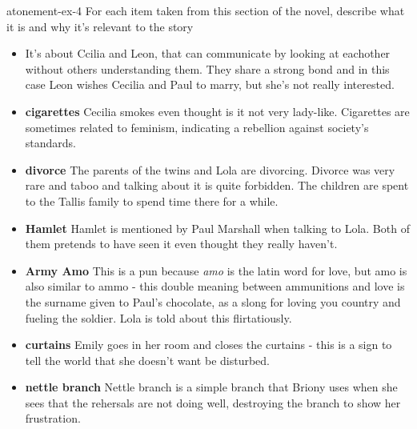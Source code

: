 \documentclass[preview]{standalone}
\begin{document}
\begin{snippetexercise}{atonement-ex-4}%
{For each item taken from this section of the novel, describe what it is and why it's relevant to the
story}
\begin{itemize}
    \item \textbf{}
        It's about Ccilia and Leon, that can communicate by looking at eachother
        without others understanding them. They share a strong bond and in this case
        Leon wishes Cecilia and Paul to marry, but she's not really interested.
    \item \textbf{cigarettes}
        Cecilia smokes even thought is it not very lady-like.
        Cigarettes are sometimes related to feminism,
        indicating a rebellion against society's standards.
    \item \textbf{divorce}
        The parents of the twins and Lola are divorcing. Divorce was
        very rare and taboo and talking about it is quite forbidden.
        The children are spent to the Tallis family to spend time there
        for a while.
    \item \textbf{Hamlet}
        Hamlet is mentioned by Paul Marshall when talking to Lola.
        Both of them pretends to have seen it even thought they really haven't.
    \item \textbf{Army Amo}
        This is a pun because \textit{amo} is the latin word for love,
        but amo is also similar to ammo - this double meaning between
        ammunitions and love is the surname given to Paul's chocolate,
        as a slong for loving you country and fueling the soldier.
        Lola is told about this flirtatiously.
    \item \textbf{curtains}
        Emily goes in her room and closes the curtains - this is a sign
        to tell the world that she doesn't want be disturbed.
    \item \textbf{nettle branch}
        Nettle branch is a simple branch that Briony uses when she sees that the rehersals
        are not doing well, destroying the branch to show her frustration.
\end{itemize}
\end{snippetexercise}
\end{document}
